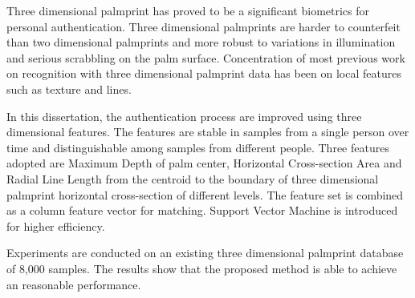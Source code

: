 
Three dimensional palmprint has proved to be a significant biometrics for personal authentication. Three dimensional palmprints are harder to counterfeit than two dimensional palmprints and more robust to variations in illumination and serious scrabbling on the palm surface. Concentration of most previous work on recognition with three dimensional palmprint data has been on local features such as texture and lines.

In this dissertation, the authentication process are improved using three dimensional features. The features are stable in samples from a single person over time and distinguishable among samples from different people. Three features adopted are Maximum Depth of palm center, Horizontal Cross-section Area and Radial Line Length from the centroid to the boundary of three dimensional palmprint horizontal cross-section of different levels. The feature set is combined as a column feature vector for matching. Support Vector Machine is introduced for higher efficiency.

Experiments are conducted on an existing three dimensional palmprint database of 8,000 samples. The results show that the proposed method is able to achieve an reasonable performance.


